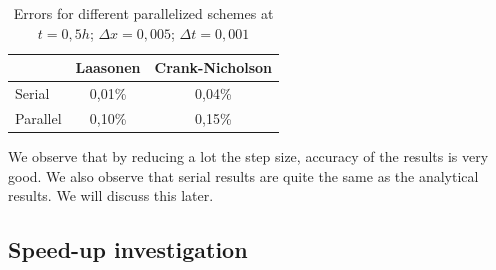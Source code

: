 \documentclass{article}
\begin{document}
                \begin{table}[H]
                    \centering
                    \caption{Errors for different parallelized schemes at $t = 0,5h$; $\Delta x=0,005$; $\Delta t=0,001$}
                    \begin{tabular}{|l|c|c|}
                        \hline
                                 & \multicolumn{1}{l|}{Laasonen} & \multicolumn{1}{l|}{Crank-Nicholson} \\ \hline
                        Serial   & 0,01\%                        & 0,04\%                               \\ \hline
                        Parallel & 0,10\%                        & 0,15\%                               \\ \hline
                    \end{tabular}
                \end{table}

                We observe that by reducing a lot the step size, accuracy of the results is very good. We also observe that serial
                results are quite the same as the analytical results. We will discuss this later.

            \subsection{Speed-up investigation}
                
\end{document}
